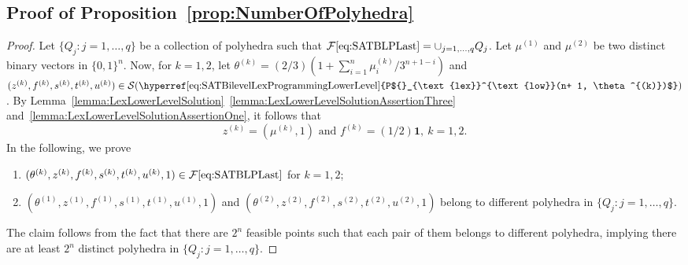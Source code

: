 \documentclass[runningheads,orivec]{llncs}
\newcommand{\MacroColor}[1]{#1}
\newcommand{\OneVector}{\mathbf{1}}
\newcommand{\NVariables}{\MacroColor{n}}
\newcommand{\OptSolSet}{\MacroColor{\mathcal{S}}}
\newcommand{\FeasSolSet}{\MacroColor{\mathcal{F}}}
\newcommand{\ReformZ}{\MacroColor{z}}
\newcommand{\ReformAugFrac}{\MacroColor{f}}
\newcommand{\LexUVar}{\MacroColor{\theta}}
\newcommand{\LexLVarS}{\MacroColor{s}}
\newcommand{\LexLVarT}{\MacroColor{t}}
\newcommand{\LexLVarU}{\MacroColor{u}}
\newcommand{\BinaryVector}{\MacroColor{\mu}}
\begin{document}
\begin{appendix}
\section{Proof of Proposition~\ref{prop:NumberOfPolyhedra}}
\label{sec:ProofOfPropNumberOfPolyhedra}

\begin{proof}
Let $\{ Q_j : j = 1, \ldots, q \}$ be a collection of polyhedra such that $\FeasSolSet\eqref{eq:SATBLPLast} = \cup_{j = 1, \ldots, q} Q_j$.
Let $\BinaryVector^{(1)}$ and $\BinaryVector^{(2)}$ be two distinct binary vectors in $\{0, 1\}^{\NVariables}$.
Now, for $k = 1, 2$, let $\LexUVar^{(k)} = (2/3) (1 + \sum_{i = 1}^{\NVariables} \BinaryVector^{(k)}_i / 3^{\NVariables + 1 - i})$ and $(\ReformZ^{(k)}, \ReformAugFrac^{(k)}, \LexLVarS^{(k)}, \LexLVarT^{(k)}, \LexLVarU^{(k)}) \in \OptSolSet(\text{\hyperref[eq:SATBilevelLexProgrammingLowerLevel]{P${}_{\text{lex}}^{\text{low}}(\NVariables + 1, \LexUVar^{(k)})$}})$.
By Lemma~\ref{lemma:LexLowerLevelSolution}~\ref{lemma:LexLowerLevelSolutionAssertionThree} and~\ref{lemma:LexLowerLevelSolutionAssertionOne}, it follows that 
\begin{equation}
\ReformZ^{(k)} = (\mu^{(k)}, 1) \text{ and } \ReformAugFrac^{(k)} = (1/2) \OneVector, \ k = 1, 2.
\label{eq:ProofOfPropNumberOfPolyhedraZandF}
\end{equation}
In the following, we prove 
\begin{enumerate}[label=(B-\arabic*)]
\item
\label{eq:ProofOfPropNumberOfPolyhedraStepOne}
$(\LexUVar^{(k)}, \ReformZ^{(k)}, \ReformAugFrac^{(k)}, \LexLVarS^{(k)}, \LexLVarT^{(k)}, \LexLVarU^{(k)}, 1) \in \FeasSolSet\eqref{eq:SATBLPLast}$ for $k = 1, 2$;
\item
\label{eq:ProofOfPropNumberOfPolyhedraStepTwo}
$(\LexUVar^{(1)}, \ReformZ^{(1)}, \ReformAugFrac^{(1)}, \LexLVarS^{(1)}, \LexLVarT^{(1)}, \LexLVarU^{(1)}, 1)$ and $(\LexUVar^{(2)}, \ReformZ^{(2)}, \ReformAugFrac^{(2)}, \LexLVarS^{(2)}, \LexLVarT^{(2)}, \LexLVarU^{(2)}, 1)$ belong to different polyhedra in $\{ Q_j : j = 1, \ldots, q \}$.
\end{enumerate}
The claim follows from the fact that there are $2^{\NVariables}$ feasible points such that each pair of them belongs to different polyhedra, implying there are at least $2^{\NVariables}$ distinct polyhedra in $\{ Q_j : j = 1, \ldots, q \}$.


\end{proof}
\end{appendix}
\end{document}
